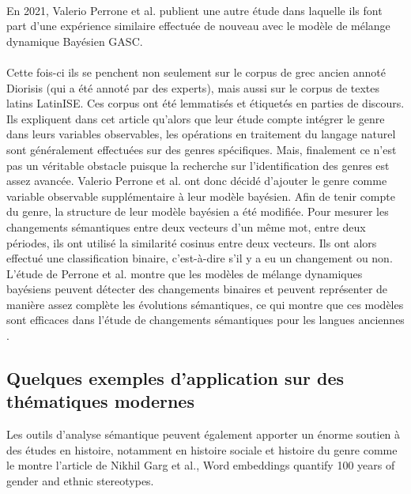 \documentclass{article}
\begin{document}
\paragraph{}
En 2021, Valerio Perrone et al. publient une autre étude \cite{perrone2021lexical} dans laquelle ils font part d’une expérience similaire effectuée de nouveau avec le modèle de mélange dynamique Bayésien GASC. 
\paragraph{}
Cette fois-ci ils se penchent non seulement sur le corpus de grec ancien annoté Diorisis (qui a été annoté par des experts), mais aussi sur le corpus de textes latins LatinISE. Ces corpus ont été lemmatisés et étiquetés en parties de discours. Ils expliquent dans cet article qu’alors que leur étude compte intégrer le genre dans leurs variables observables, les opérations en traitement du langage naturel sont généralement effectuées sur des genres spécifiques. Mais, finalement ce n’est pas un véritable obstacle puisque la recherche sur l’identification des genres est assez avancée. Valerio Perrone et al. ont donc décidé d’ajouter le genre comme variable observable supplémentaire à leur modèle bayésien. Afin de tenir compte du genre, la structure de leur modèle bayésien a été modifiée. Pour mesurer les changements sémantiques entre deux vecteurs d’un même mot, entre deux périodes, ils ont utilisé la similarité cosinus entre deux vecteurs. Ils ont alors effectué une classification binaire, c’est-à-dire s’il y a eu un changement ou non. L’étude de Perrone et al. montre que les modèles de mélange dynamiques bayésiens peuvent détecter des changements binaires et peuvent représenter de manière assez complète les évolutions sémantiques, ce qui montre que ces modèles sont efficaces dans l’étude de changements sémantiques pour les langues anciennes \cite{perrone2021lexical}.

\subsection{Quelques exemples d'application sur des thématiques modernes}
Les outils d’analyse sémantique peuvent également apporter un énorme soutien à des études en histoire, notamment en histoire sociale et histoire du genre comme le montre l’article de Nikhil Garg et al., Word embeddings quantify 100 years of gender and ethnic stereotypes. 



\end{document}
